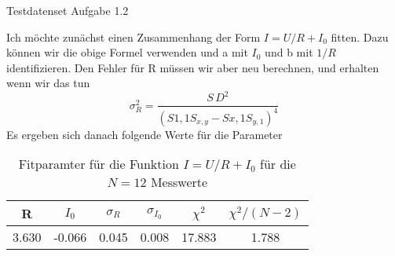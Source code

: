 \documentclass[12pt]{article}
\begin{document}


\begin{table}[H]\centering
    \caption{Testdatenset Aufgabe 1.2}
    \end{table} 
Ich möchte zunächst einen Zusammenhang der Form $I=U/R+I_0$ fitten. Dazu können wir die obige Formel verwenden und a mit $I_0$ und b mit $1/R$ identifizieren. Den Fehler für R müssen wir aber neu berechnen, und erhalten wenn wir das tun
$$\sigma_R^2=\frac{S\,D^2}{(S{1,1}S_{x,y}-S{x,1}S_{y,1})^4}$$
Es ergeben sich danach folgende Werte für die Parameter
\begin{table}[H]\centering\begin{tabular}{c|c|c|c|c|c}R&$I_0$&$\sigma_R$&$\sigma_{I_0}$&$\chi^2$&$\chi^2/(N-2)$\\\hline
    3.630&-0.066&0.045&0.008&17.883&1.788
\end{tabular}\caption{Fitparamter für die Funktion $I=U/R+I_0$ für die $N=12$ Messwerte}\end{table}
\end{document}

